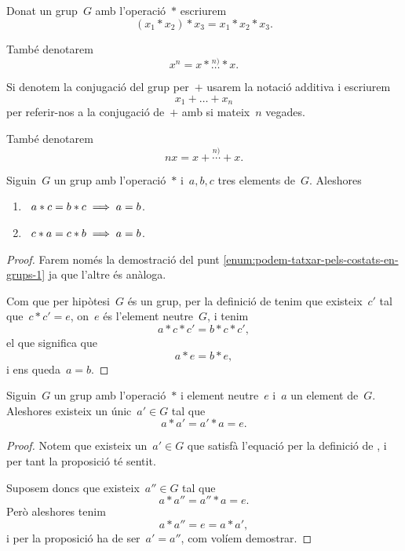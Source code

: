 \documentclass[../estructures-algebraiques.tex]{subfiles}
\begin{document}
    \begin{notation}
        \label{notation:potencies-per-loperacio-repetida-en-un-grup}
        Donat un grup~\(G\) amb l'operació~\(\ast\) escriurem
        \[
            (x_{1}\ast x_{2})\ast x_{3}=x_{1}\ast x_{2}\ast x_{3}.
        \]

        També denotarem
        \[
            x^{n}=x\ast\overset{n)}{\dots}\ast x.
        \]

        Si denotem la conjugació del grup per~\(+\) usarem la notació additiva i escriurem
        \[
            x_{1}+\dots+x_{n}
        \]
        per referir-nos a la conjugació de~\(+\) amb si mateix~\(n\) vegades.

        També denotarem
        \[
            nx=x+\overset{n)}{\cdots}+ x.
        \]
    \end{notation}
    \begin{proposition}
        \label{prop:podem-tatxar-pels-costats-en-grups}
        Siguin~\(G\) un grup amb l'operació~\(\ast\) i~\(a,b,c\) tres elements de~\(G\).
        Aleshores
        \begin{enumerate}
            \item\label{enum:podem-tatxar-pels-costats-en-grups-1}~\(a\ast c=b\ast c\implies a=b\).
            \item\label{enum:podem-tatxar-pels-costats-en-grups-2}~\(c\ast a=c\ast b\implies a=b\).
        \end{enumerate}
    \end{proposition}
    \begin{proof}
        Farem només la demostració del punt \eqref{enum:podem-tatxar-pels-costats-en-grups-1} ja que l'altre és anàloga.

        Com que per hipòtesi~\(G\) és un grup, per la definició de  tenim que existeix~\(c'\) tal que~\(c\ast c'=e\), on~\(e\) és l'element neutre~\(G\), i tenim
        \[
            a\ast c\ast c'=b\ast c\ast c',
        \]
        el que significa que
        \[
            a\ast e=b\ast e,
        \]
        i ens queda~\(a=b\).
    \end{proof}
    \begin{proposition}
        \label{prop:unicitat-inversa-en-grups}
        Siguin~\(G\) un grup amb l'operació~\(\ast\) i element neutre~\(e\) i~\(a\) un element de~\(G\).
        Aleshores existeix un únic~\(a'\in G\) tal que
        \[
            a\ast a'=a'\ast a=e.
        \]
    \end{proposition}
    \begin{proof}
        Notem que existeix un~\(a'\in G\) que satisfà l'equació per la definició de , i per tant la proposició té sentit.

        Suposem doncs que existeix~\(a''\in G\) tal que
        \[
            a\ast a''=a''\ast a=e.
        \]
        Però aleshores tenim
        \[
            a\ast a''=e=a\ast a',
        \]
        i per la proposició  ha de ser~\(a'=a''\), com volíem demostrar.
    \end{proof}
\end{document}
